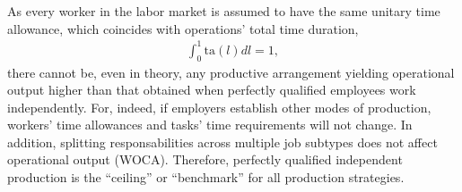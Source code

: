 \documentclass[hidelinks, nonatbib]{elsarticle}
\begin{document}
\begin{enumerate}
    As every worker in the labor market is assumed to have the same unitary time allowance, which coincides with operations' total time duration,
        \begin{gather}
            \int_{0}^{1}{
                \text{ta}(l)
                dl
            }
            =
            1
            ,
        \end{gather}
        there cannot be, even in theory, any productive arrangement yielding operational output higher than that obtained when perfectly qualified employees work independently. For, indeed, if employers establish other modes of production, workers' time allowances and tasks' time requirements will not change. In addition, splitting responsabilities across multiple job subtypes does not affect operational output (WOCA). Therefore, perfectly qualified independent production is the ``ceiling'' or ``benchmark'' for all production strategies.
        

\end{enumerate}
\end{document}
